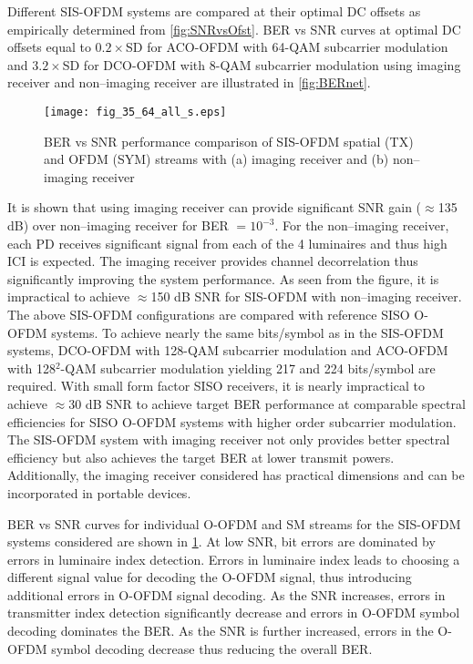 Different SIS-OFDM systems are compared at their optimal DC offsets as empirically determined from \figurename{ \ref{fig:SNRvsOfst}}. BER vs SNR curves at optimal DC offsets equal to $0.2\times$SD for ACO-OFDM with 64-QAM subcarrier modulation and $3.2\times$SD for DCO-OFDM with 8-QAM subcarrier modulation using imaging receiver and non--imaging receiver are illustrated in \figurename{ \ref{fig:BERnet}}. 
\begin{figure}[!t]
\centering
\texttt{[image: fig\_35\_64\_all\_s.eps]}
\caption[Performance of SIS-OFDM spatial and OFDM streams]{BER vs SNR performance comparison of SIS-OFDM spatial (TX) and OFDM (SYM) streams with (a) imaging receiver and (b) non--imaging receiver}
	\label{fig:BERsplit}
\end{figure}
It is shown that using imaging receiver can provide significant SNR gain ($\approx$135 dB) over non--imaging receiver for BER $=10^{-3}$. For the non--imaging receiver, each PD receives significant signal from each of the 4 luminaires and thus high ICI is expected. The imaging receiver provides channel decorrelation thus significantly improving the system performance. As seen from the figure, it is impractical to achieve $\approx$150 dB SNR for SIS-OFDM with non--imaging receiver. The above SIS-OFDM configurations are compared with reference SISO O-OFDM systems. To achieve nearly the same bits/symbol as in the SIS-OFDM systems, DCO-OFDM with 128-QAM subcarrier modulation and ACO-OFDM with 128$^2$-QAM subcarrier modulation yielding 217 and 224 bits/symbol are required. With small form factor SISO receivers, it is nearly impractical to achieve $\approx$30 dB SNR to achieve target BER performance at comparable spectral efficiencies for SISO O-OFDM systems with higher order subcarrier modulation. The SIS-OFDM system with imaging receiver not only provides better spectral efficiency but also achieves the target BER at lower transmit powers. Additionally, the imaging receiver considered has practical dimensions and can be incorporated in portable devices.

BER vs SNR curves for individual O-OFDM and SM streams for the SIS-OFDM systems considered are shown in \figurename{ \ref{fig:BERsplit}}. At low SNR, bit errors are dominated by errors in luminaire index detection. Errors in luminaire index leads to choosing a different signal value for decoding the O-OFDM signal, thus introducing additional errors in O-OFDM signal decoding. As the SNR increases, errors in transmitter index detection significantly decrease and errors in O-OFDM symbol decoding dominates the BER. As the SNR is further increased, errors in the O-OFDM symbol decoding decrease thus reducing the overall BER.

